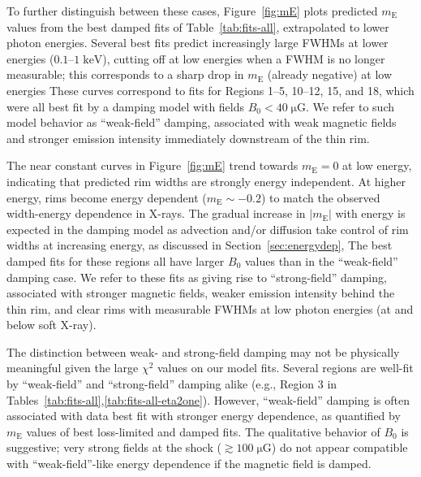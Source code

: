 \documentclass[manuscript]{aastex}  %
\newcommand*{\mt}{\mathrm}
\newcommand*{\unit}[1]{\;\mt{#1}}  %
\newcommand*{\mE}{m_\mt{E}}
\newcommand*{\muG}{\unit{\mu G}}
\begin{document}
To further distinguish between these cases, Figure~\ref{fig:mE} plots predicted
$\mE$ values from the best damped fits of Table~\ref{tab:fits-all},
extrapolated to lower photon energies.  Several best fits predict increasingly
large FWHMs at lower energies ($0.1$--$1 \unit{keV}$), cutting off at low
energies when a FWHM is no longer measurable; this corresponds to a sharp
drop in $\mE$ (already negative) at low energies These curves correspond to
fits for Regions 1--5, 10--12, 15, and 18, which were all best fit by a
damping model with fields $B_0 < 40 \muG$.  We refer to such model behavior as
``weak-field'' damping, associated with weak magnetic fields and stronger
emission intensity immediately downstream of the thin rim.

The near constant curves in Figure~\ref{fig:mE} trend towards $\mE = 0$ at low
energy, indicating that predicted rim widths are strongly energy independent.
At higher energy, rims become energy dependent ($\mE \sim -0.2$) to match the
observed width-energy dependence in X-rays.  The gradual increase in $|\mE|$
with energy is expected in the damping model as advection and/or diffusion take
control of rim widths at increasing energy, as discussed in
Section~\ref{sec:energydep},  The best damped fits for these regions all have
larger $B_0$ values than in the ``weak-field'' damping case.  We refer to these
fits as giving rise to ``strong-field'' damping, associated with stronger
magnetic fields, weaker emission intensity behind the thin rim, and clear rims
with measurable FWHMs at low photon energies (at and below soft X-ray).

The distinction between weak- and strong-field damping may not
be physically meaningful given the large $\chi^2$ values on our model fits.
Several regions are well-fit by ``weak-field'' and ``strong-field'' damping
alike (e.g., Region 3 in Tables~\ref{tab:fits-all},\ref{tab:fits-all-eta2one}).
However, ``weak-field'' damping is often associated with data best fit with
stronger energy dependence, as quantified by $\mE$ values of best loss-limited
and damped fits.  The qualitative behavior of $B_0$ is suggestive; very strong
fields at the shock ($\gtrsim 100 \muG$) do not appear compatible with
``weak-field''-like energy dependence if the magnetic field is damped.

\end{document}
